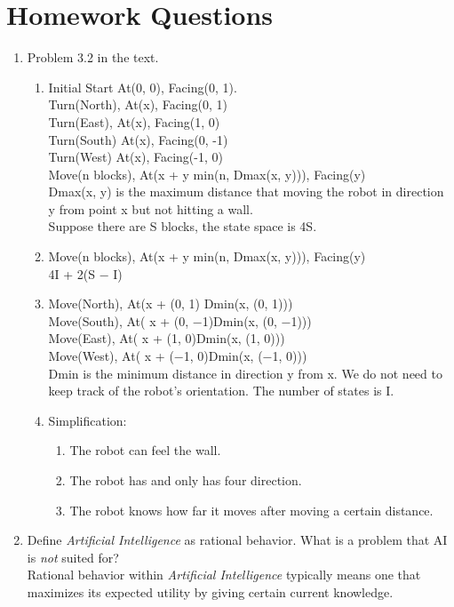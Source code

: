 \documentclass{article}
\begin{document}
\section*{Homework Questions}
\begin{enumerate}
\item Problem 3.2 in the text.
\begin{enumerate}
\item Initial Start At(0, 0), Facing(0, 1).
\\ Turn(North), {At(x), Facing(0, 1)}
\\ Turn(East), {At(x), Facing(1, 0)}
\\ Turn(South) {At(x), Facing(0, -1)}
\\ Turn(West) {At(x), Facing(-1, 0)}
\\ Move(n blocks), At(x + y min(n, Dmax(x, y))), Facing(y)
\\ Dmax(x, y) is the maximum distance that moving the robot in direction y from point x but not hitting a wall.
\\ Suppose there are S blocks, the state space is 4S.
\item Move(n blocks), At(x + y min(n, Dmax(x, y))), Facing(y)
\\ 4I + 2(S − I)
\item Move(North), At(x + (0, 1) Dmin(x, (0, 1)))
\\ Move(South), At( x + (0, −1)Dmin(x, (0, −1)))
\\ Move(East), At( x + (1, 0)Dmin(x, (1, 0)))
\\ Move(West), At( x + (−1, 0)Dmin(x, (−1, 0)))
\\ Dmin is the minimum distance in direction y from x. We do not need to keep track of the robot's orientation. The number of states is I.
\item Simplification:
\begin{enumerate}
\item The robot can feel the wall.
\item The robot has and only has four direction.
\item The robot knows how far it moves after moving a certain distance.
\end{enumerate}
\end{enumerate}
\item Define {\it Artificial Intelligence} as rational behavior.  What is a problem that AI is {\it not} suited for?
\\ Rational behavior within {\it Artificial Intelligence} typically means one that maximizes its expected utility by giving certain current knowledge.

\end{enumerate}
\end{document}
